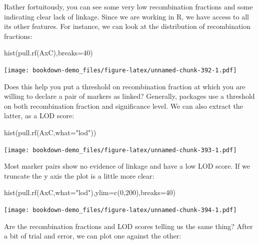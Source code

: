\documentclass[
]{book}
\newenvironment{Shaded}{\begin{snugshade}}{\end{snugshade}}
\newcommand{\AttributeTok}[1]{\textcolor[rgb]{0.77,0.63,0.00}{#1}}
\newcommand{\DecValTok}[1]{\textcolor[rgb]{0.00,0.00,0.81}{#1}}
\newcommand{\FunctionTok}[1]{\textcolor[rgb]{0.00,0.00,0.00}{#1}}
\newcommand{\NormalTok}[1]{#1}
\newcommand{\StringTok}[1]{\textcolor[rgb]{0.31,0.60,0.02}{#1}}
\begin{document}
Rather fortuitously, you can see some very low recombination fractions and some indicating clear lack of linkage. Since we are working in R, we have access to all its other features. For instance, we can look at the distribution of recombination fractions:

\begin{Shaded}
\begin{Highlighting}[]
\FunctionTok{hist}\NormalTok{(}\FunctionTok{pull.rf}\NormalTok{(AxC),}\AttributeTok{breaks=}\DecValTok{40}\NormalTok{) }
\end{Highlighting}
\end{Shaded}

\texttt{[image: bookdown-demo\_files/figure-latex/unnamed-chunk-392-1.pdf]}

Does this help you put a threshold on recombination fraction at which you are willing to declare a pair of markers as linked? Generally, packages use a threshold on both recombination fraction and significance level. We can also extract the latter, as a LOD score:

\begin{Shaded}
\begin{Highlighting}[]
\FunctionTok{hist}\NormalTok{(}\FunctionTok{pull.rf}\NormalTok{(AxC,}\AttributeTok{what=}\StringTok{"lod"}\NormalTok{)) }
\end{Highlighting}
\end{Shaded}

\texttt{[image: bookdown-demo\_files/figure-latex/unnamed-chunk-393-1.pdf]}

Most marker pairs show no evidence of linkage and have a low LOD score. If we truncate the y axis the plot is a little more clear:

\begin{Shaded}
\begin{Highlighting}[]
\FunctionTok{hist}\NormalTok{(}\FunctionTok{pull.rf}\NormalTok{(AxC,}\AttributeTok{what=}\StringTok{"lod"}\NormalTok{),}\AttributeTok{ylim=}\FunctionTok{c}\NormalTok{(}\DecValTok{0}\NormalTok{,}\DecValTok{200}\NormalTok{),}\AttributeTok{breaks=}\DecValTok{40}\NormalTok{) }
\end{Highlighting}
\end{Shaded}

\texttt{[image: bookdown-demo\_files/figure-latex/unnamed-chunk-394-1.pdf]}

Are the recombination fractions and LOD scores telling us the same thing? After a bit of trial and error, we can plot one against the other:
\end{document}
